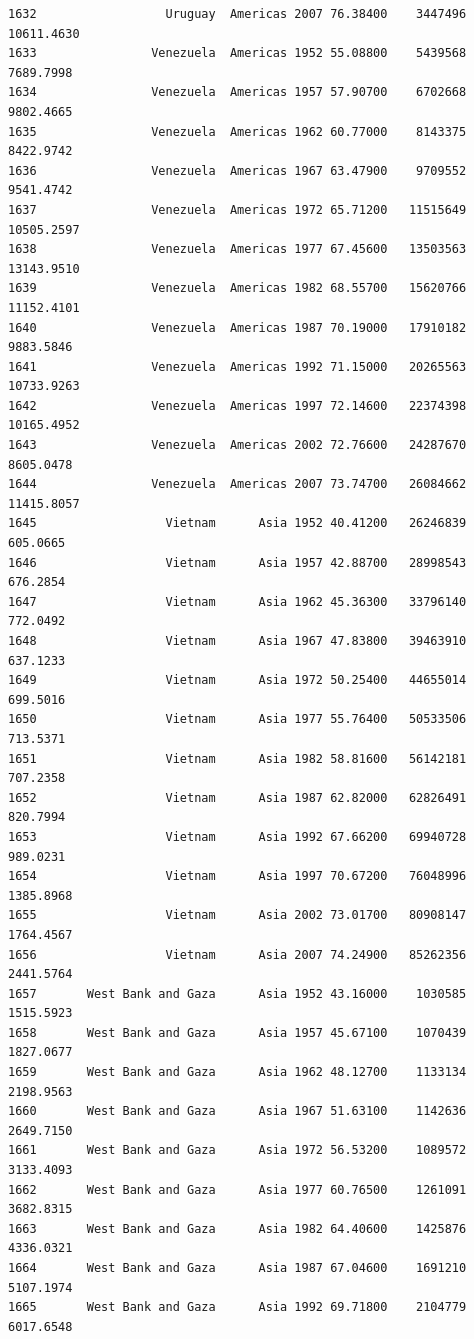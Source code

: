 \documentclass[
  letterpaper,
  DIV=11,
  numbers=noendperiod]{scrreprt}
\begin{document}
\begin{verbatim}
1632                  Uruguay  Americas 2007 76.38400    3447496  10611.4630
1633                Venezuela  Americas 1952 55.08800    5439568   7689.7998
1634                Venezuela  Americas 1957 57.90700    6702668   9802.4665
1635                Venezuela  Americas 1962 60.77000    8143375   8422.9742
1636                Venezuela  Americas 1967 63.47900    9709552   9541.4742
1637                Venezuela  Americas 1972 65.71200   11515649  10505.2597
1638                Venezuela  Americas 1977 67.45600   13503563  13143.9510
1639                Venezuela  Americas 1982 68.55700   15620766  11152.4101
1640                Venezuela  Americas 1987 70.19000   17910182   9883.5846
1641                Venezuela  Americas 1992 71.15000   20265563  10733.9263
1642                Venezuela  Americas 1997 72.14600   22374398  10165.4952
1643                Venezuela  Americas 2002 72.76600   24287670   8605.0478
1644                Venezuela  Americas 2007 73.74700   26084662  11415.8057
1645                  Vietnam      Asia 1952 40.41200   26246839    605.0665
1646                  Vietnam      Asia 1957 42.88700   28998543    676.2854
1647                  Vietnam      Asia 1962 45.36300   33796140    772.0492
1648                  Vietnam      Asia 1967 47.83800   39463910    637.1233
1649                  Vietnam      Asia 1972 50.25400   44655014    699.5016
1650                  Vietnam      Asia 1977 55.76400   50533506    713.5371
1651                  Vietnam      Asia 1982 58.81600   56142181    707.2358
1652                  Vietnam      Asia 1987 62.82000   62826491    820.7994
1653                  Vietnam      Asia 1992 67.66200   69940728    989.0231
1654                  Vietnam      Asia 1997 70.67200   76048996   1385.8968
1655                  Vietnam      Asia 2002 73.01700   80908147   1764.4567
1656                  Vietnam      Asia 2007 74.24900   85262356   2441.5764
1657       West Bank and Gaza      Asia 1952 43.16000    1030585   1515.5923
1658       West Bank and Gaza      Asia 1957 45.67100    1070439   1827.0677
1659       West Bank and Gaza      Asia 1962 48.12700    1133134   2198.9563
1660       West Bank and Gaza      Asia 1967 51.63100    1142636   2649.7150
1661       West Bank and Gaza      Asia 1972 56.53200    1089572   3133.4093
1662       West Bank and Gaza      Asia 1977 60.76500    1261091   3682.8315
1663       West Bank and Gaza      Asia 1982 64.40600    1425876   4336.0321
1664       West Bank and Gaza      Asia 1987 67.04600    1691210   5107.1974
1665       West Bank and Gaza      Asia 1992 69.71800    2104779   6017.6548

\end{verbatim}
\end{document}
